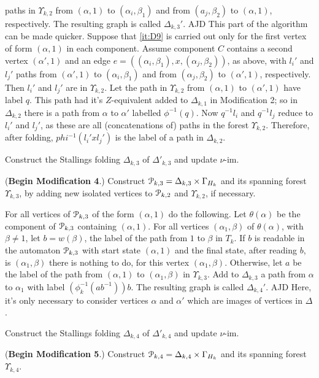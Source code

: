 \documentclass[a4paper,12pt]{article}
\renewcommand{\a}{\alpha }
\renewcommand{\b}{\beta }
\newcommand{\G}{\Gamma }
\newcommand{\D}{\Delta }
\newcommand{\U}{\Upsilon }
\newcommand{\cP}{{\cal{P}}}
\newcommand{\vim}{\nu\textrm{-im}}
\numberwithin{equation}{section}
\numberwithin{figure}{section}
\newenvironment{ajd1}{\noindent\color{red} AJD }{}
\newcommand{\ajd}[1]{\begin{ajd1} #1 \end{ajd1}}
\begin{document}
paths in $\U_{k,2}$ from $(\a,1)$ to $(\a_i,\b_1)$ and from $(a_j,\b_2)$ 
to $(\a,1)$,
respectively. The resulting graph is called  $\D_{k,3}'$.
\ajd{This part of the algorithm can be made quicker. 
Suppose that \ref{it:D9} is carried out only for the first vertex of form $(\a,1)$ in 
each component. Assume  component $C$ contains a second vertex $(\a',1)$ and an edge 
$e=((\a_i,\b_1),x,(\a_j,\b_2))$, as above, with $l_i'$ and $l_j'$ paths from 
$(\a',1)$ to $(\a_i,\b_1)$ and from $(\a_j,\b_2)$ to $(\a',1)$, respectively. Then 
$l_i'$ and $l_j'$ are in $\U_{k,2}$. Let the path in $\U_{k,2}$ from $(\a,1)$ to $(\a',1)$ have 
label $q$. This path had it's 
$Z$-equivalent added to $\D_{k,1}$ in Modification 2; so in $\D_{k,2}$ there is a path from $\a$
to $\a'$ labelled $\phi^{-1}(q)$. Now $q^{-1}l_i$ and $q^{-1}l_j$ reduce to $l_i'$ and $l_j'$, as 
these are all (concatenations of) paths in the forest $\U_{k,2}$. Therefore, after folding,
$phi^{-1}(l_i'xl_j')$ is the label of  a path in $\D_{k,2}$.}
\item\label{it:D10} Construct the Stallings folding $\D_{k,3}$ of 
$\D'_{k,3}$ and update $\vim$.
\item\label{it:D11} (\textbf{Begin Modification 4}.)
 Construct  $\cP_{k,3}=\D_{k,3}\times \G_{H_k}$ and its spanning
 forest $\U_{k,3}$, by adding new isolated vertices to $\cP_{k,2}$ and 
$\U_{k,2}$,
if necessary. 
\item\label{it:D12} For all vertices of $\cP_{k,3}$ of the 
form $(\a,1)$ do the following.
Let $\theta(\a)$ be the component of $\cP_{k,3}$ containing $(\a,1)$.
For all vertices $(\a_1,\b)$ of $\theta(\a)$, with $\b\neq 1$, let
$b=w(\b)$, the label of the path from $1$ to $\b$ in $T_k$. If
$b$ is readable in the automaton $\cP_{k,3}$ with start state $(\a,1)$ and
the final state, after reading $b$, is $(\a_1,\b)$ there is nothing to do,
for this vertex $(\a_1,\b)$. Otherwise, let $a$ be the label of the
path from $(\a,1)$ to $(\a_1,\b)$ in $\U_{k,3}$. Add to $\D_{k,3}$ a path from
$\a$ to $\a_1$ with label $(\phi_k^{-1}(ab^{-1}))b$.
The resulting graph is called $\D_{k,4}'$. 
\ajd{Here, it's only necessary to consider vertices $\a$ and $\a'$ which are images of vertices in
$\D$.}
\item\label{it:D13} Construct the Stallings folding $\D_{k,4}$ of $\D'_{k,4}$ 
and update $\vim$.
\item\label{it:D14} (\textbf{Begin Modification 5}.)
Construct  $\cP_{k,4}=\D_{k,4}\times \G_{H_k}$ and its spanning
 forest $\U_{k,4}$. 
\end{document}
